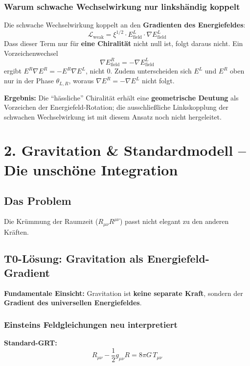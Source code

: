 	\subsubsection*{Warum schwache Wechselwirkung nur linkshändig koppelt}
	
	Die schwache Wechselwirkung koppelt an den \textbf{Gradienten des Energiefeldes}:
	\[
	\mathcal{L}_{\text{weak}} = \xi^{1/2} \cdot E_{\text{field}}^L \cdot \nabla E_{\text{field}}^L
	\]
	Dass dieser Term nur für \textbf{eine Chiralität} nicht null ist, folgt daraus nicht. Ein Vorzeichenwechsel
	\[
	\nabla E_{\text{field}}^R = -\nabla E_{\text{field}}^L
	\]
	ergibt $E^R\nabla E^R = -E^R\nabla E^L$, nicht $0$. Zudem unterscheiden sich $E^L$ und $E^R$ oben nur in der Phase $\theta_{L,R}$, woraus $\nabla E^R = -\nabla E^L$ nicht folgt.
	
	\textbf{Ergebnis:} Die ``hässliche'' Chiralität erhält eine \textbf{geometrische Deutung} als Vorzeichen der Energiefeld-Rotation; die ausschließliche Linkskopplung der schwachen Wechselwirkung ist mit diesem Ansatz noch nicht hergeleitet.
	
	
	
	\section*{2. Gravitation \& Standardmodell – Die unschöne Integration}
	
	\subsection*{Das Problem}
	Die Krümmung der Raumzeit ($R_{\mu\nu} R^{\mu\nu}$) passt nicht elegant zu den anderen Kräften.
	
	\subsection*{T0-Lösung: Gravitation als Energiefeld-Gradient}
	
	\textbf{Fundamentale Einsicht:} Gravitation ist \textbf{keine separate Kraft}, sondern der \textbf{Gradient des universellen Energiefeldes}.
	
	\subsubsection*{Einsteins Feldgleichungen neu interpretiert}
	
	\textbf{Standard-GRT:}
	\[
	R_{\mu\nu} - \frac{1}{2}g_{\mu\nu}R = 8\pi G \, T_{\mu\nu}
	\]
	
